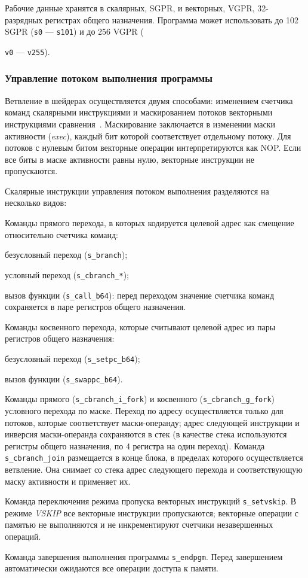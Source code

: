 \documentclass[a4paper,14pt]{extarticle}
\begin{document}
Рабочие данные хранятся в скалярных, SGPR, и векторных, VGPR,
32-разрядных регистрах общего назначения. Программа может использовать до 102
SGPR (\verb|s0| — \verb|s101|) и до 256 VGPR ({\verb|v0| — \verb|v255|).

\subsubsection{Управление потоком выполнения программы}
\label{section:gcn-program-flow}

Ветвление в шейдерах осуществляется двумя способами: изменением счетчика команд скалярными
инструкциями и маскированием потоков векторными инструкциями сравнения~\cite{vega-isa}.
Маскирование заключается в изменении маски активности (\textit{exec}), каждый бит которой
соответствует отдельному потоку. Для потоков с нулевым битом векторные операции интерпретируются как NOP.
Если все биты в маске активности равны нулю, векторные инструкции не пропускаются.

Скалярные инструкции управления потоком выполнения разделяются на несколько видов:
\begin{ol}
\item Команды прямого перехода, в которых кодируется целевой адрес как смещение относительно счетчика команд:
  \begin{ul}
  \item безусловный переход (\verb|s_branch|);
  \item условный переход (\verb|s_cbranch_*|);
  \item вызов функции (\verb|s_call_b64|): перед переходом значение счетчика команд
  сохраняется в паре регистров общего назначения.
  \end{ul}
\item Команды косвенного перехода, которые считывают целевой адрес из пары регистров общего назначения:
  \begin{ul}
  \item безусловный переход (\verb|s_setpc_b64|);
  \item вызов функции (\verb|s_swappc_b64|).
  \end{ul}
\item Команды прямого (\verb|s_cbranch_i_fork|) и косвенного (\verb|s_cbranch_g_fork|)
  условного перехода по маске. Переход по адресу осуществляется только для потоков, которые соответствует
  маски-операнду; адрес следующей инструкции и инверсия маски-операнда сохраняются в стек
  (в качестве стека используются регистры общего назначения, по 4 регистра на один переход).
  Команда \verb|s_cbranch_join| размещается в конце блока, в пределах которого осуществляется ветвление.
  Она снимает со стека адрес следующего перехода и соответствующую маску активности и применяет их.
\item Команда переключения режима пропуска векторных инструкций \verb|s_setvskip|. В режиме
  \textit{VSKIP} все векторные инструкции пропускаются; векторные операции с памятью не выполняются
  и не инкрементируют счетчики незавершенных операций.
\item Команда завершения выполнения программы \verb|s_endpgm|. Перед завершением автоматически
  ожидаются все операции доступа к памяти.
\end{ol}

}
\end{document}

